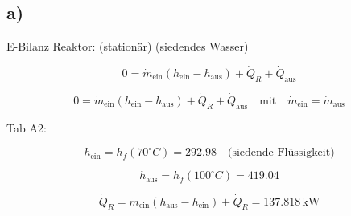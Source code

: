 

\subsection*{a)}

E-Bilanz Reaktor: (stationär) (siedendes Wasser)

\[
0 = \dot{m}_{\text{ein}} (h_{\text{ein}} - h_{\text{aus}}) + \dot{Q}_R + \dot{Q}_{\text{aus}}
\]

\[
0 = \dot{m}_{\text{ein}} (h_{\text{ein}} - h_{\text{aus}}) + \dot{Q}_R + \dot{Q}_{\text{aus}} \quad \text{mit} \quad \dot{m}_{\text{ein}} = \dot{m}_{\text{aus}}
\]

Tab A2:

\[
h_{\text{ein}} = h_f (70^\circ C) = 292.98 \quad \text{(siedende Flüssigkeit)}
\]

\[
h_{\text{aus}} = h_f (100^\circ C) = 419.04
\]

\[
\dot{Q}_R = \dot{m}_{\text{ein}} (h_{\text{aus}} - h_{\text{ein}}) + \dot{Q}_R = 137.818 \, \text{kW}
\]
